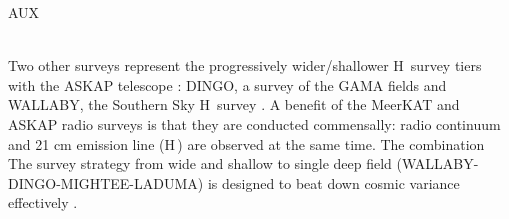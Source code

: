 {\begin{tasklist}{AUX}
\begin{task}
{~\\
Two other surveys represent the progressively wider/shallower H\,{} survey tiers with the ASKAP telescope \citep{johnston2007a}: DINGO, a survey of the GAMA fields \citep[][Meyer+ {\em in prep}]{driver2009a,duffy2012a,meyer2015a} and WALLABY, the Southern Sky H\,{} survey \citep[][Koribalski+ {\em in prep}]{duffy2012a}.
 A benefit of the MeerKAT and ASKAP radio surveys is that they are conducted commensally: radio continuum and 21 cm emission line (H\,{}) are observed at the same time. The combination 
The survey strategy from wide and shallow to single deep field (WALLABY-DINGO-MIGHTEE-LADUMA) is designed to beat down cosmic variance effectively \citep[see e.g.,][]{maddox2016a}.
}
~\\
~\\
\end{task}



\end{tasklist}
}
